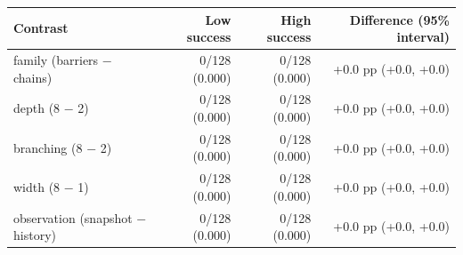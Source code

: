 \begin{tabular}{lrrr}
\toprule
Contrast & Low success & High success & Difference (95\% interval) \\
\midrule
family (barriers $-$ chains) & 0/128 (0.000) & 0/128 (0.000) & +0.0 pp (+0.0, +0.0) \\
depth (8 $-$ 2) & 0/128 (0.000) & 0/128 (0.000) & +0.0 pp (+0.0, +0.0) \\
branching (8 $-$ 2) & 0/128 (0.000) & 0/128 (0.000) & +0.0 pp (+0.0, +0.0) \\
width (8 $-$ 1) & 0/128 (0.000) & 0/128 (0.000) & +0.0 pp (+0.0, +0.0) \\
observation (snapshot $-$ history) & 0/128 (0.000) & 0/128 (0.000) & +0.0 pp (+0.0, +0.0) \\
\bottomrule
\end{tabular}
